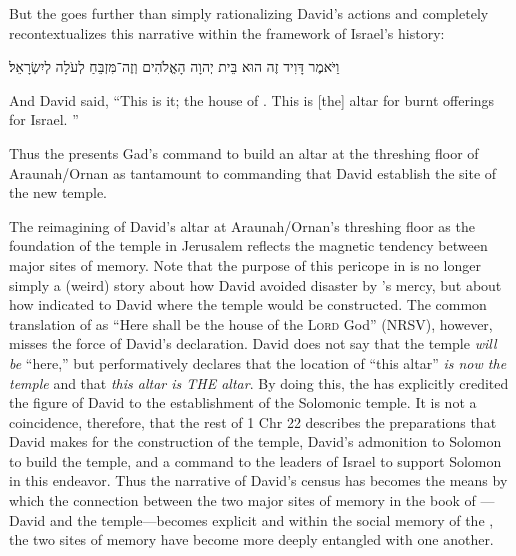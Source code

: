 But the \chronicler goes further than simply rationalizing David's actions and completely recontextualizes this narrative within the framework of Israel's history:
\begin{hebrewtext}
    וַיֹּאמֶר דָּוִיד זֶה הוּא בֵּית יְהוָה הָאֱלֹהִים וְזֶה־מִּזְבֵּחַ לְעֹלָה לְיִשְׂרָאֵל׃ 
\end{hebrewtext}
\begin{translation}
    And David said, ``This is it; the house of \yahweh. This is [the] altar for burnt offerings for Israel. ''
\end{translation}
\noindent
Thus the \chronicler presents Gad's command to build an altar at the threshing floor of Araunah/Ornan as tantamount to commanding that David establish the site of the new temple.  

The reimagining of David's altar at Araunah/Ornan's threshing floor as the foundation of the temple in Jerusalem reflects the magnetic tendency between major sites of memory. Note that the purpose of this pericope in \chronicles is no longer simply a (weird) story about how David avoided disaster by \yahweh's mercy, but about how \yahweh indicated to David where the temple would be constructed. The common translation of  as ``Here shall be the house of the \textsc{Lord} God'' (NRSV), however, misses the force of David's declaration. David does not say that the temple \emph{will be} ``here,'' but performatively declares that the location of ``this altar'' \emph{is now the temple} and that \emph{this altar is THE altar}. By doing this, the \chronicler has explicitly credited the figure of David to the establishment of the Solomonic temple. It is not a coincidence, therefore, that the rest of 1 Chr 22 describes the preparations that David makes for the construction of the temple, David's admonition to Solomon to build the temple, and a command to the leaders of Israel to support Solomon in this endeavor. Thus the narrative of David's census has becomes the means by which the connection between the two major sites of memory in the book of \chronicles---David and the temple---becomes explicit and within the social memory of the \chronicler, the two sites of memory have become more deeply entangled with one another.


